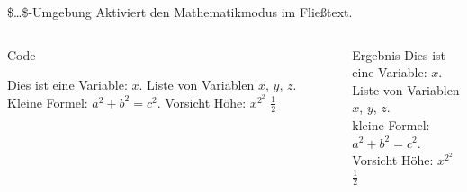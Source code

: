 \begin{frame}[fragile]{\$\dots\$-Umgebung}
  Aktiviert den Mathematikmodus im Fließtext. 

  \begin{columns}[t]
      \begin{column}{0.55\textwidth}
          \begin{block}{Code}
              \begin{lstverbatim}
                Dies ist eine Variable: $x$. 
                Liste von Variablen $x$, $y$, $z$.
                Kleine Formel: $a^2 + b^2 = c^2$.
                Vorsicht Höhe: $x^{2^2}$ $\frac{1}{2}$
              \end{lstverbatim}
          \end{block}
      \end{column}
      \begin{column}{0.4\textwidth}
          \begin{block}{Ergebnis}
                Dies ist eine Variable: $x$. \\
                Liste von Variablen $x$, $y$, $z$. \\
                kleine Formel: $a^2 + b^2 = c^2$. \\
                Vorsicht Höhe: $x^{2^2}$ $\frac{1}{2}$
          \end{block}
      \end{column}
  \end{columns}
\end{frame}

